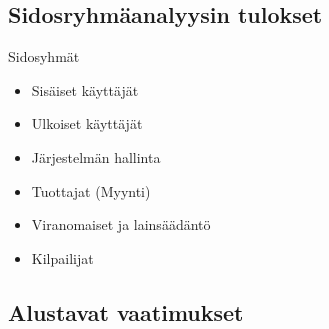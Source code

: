 \documentclass{beamer}
\begin{document}
\subsection{Sidosryhmäanalyysin tulokset}

\begin{frame}{Sidosyhmät}
\begin{itemize}
	\item Sisäiset käyttäjät
	\item Ulkoiset käyttäjät
	\item Järjestelmän hallinta
	\item Tuottajat (Myynti)
	\item Viranomaiset ja lainsäädäntö
	\item Kilpailijat
\end{itemize}
\end{frame}


\subsection{Alustavat vaatimukset}
\end{document}
